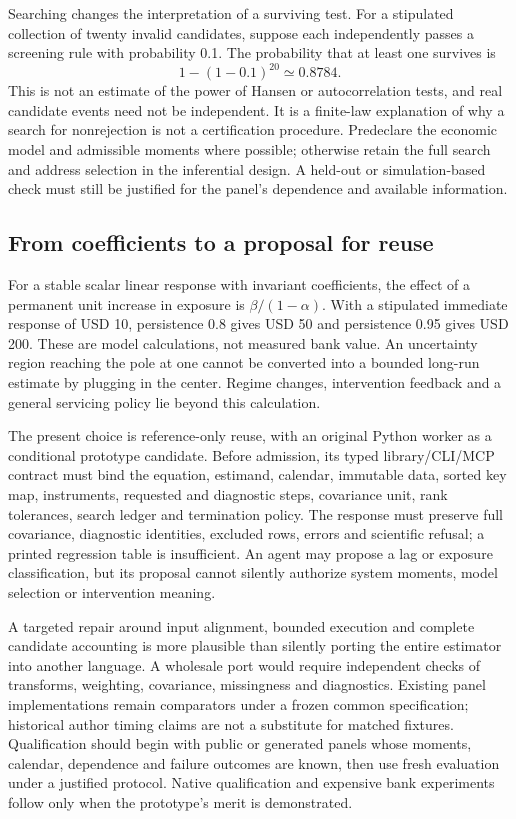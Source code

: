 Searching changes the interpretation of a surviving test. For a stipulated collection
of twenty invalid candidates, suppose each independently passes a screening rule with
probability 0.1. The probability that at least one survives is
\begin{equation}
 1-(1-0.1)^{20}\simeq0.8784.
\end{equation}
This is not an estimate of the power of Hansen or autocorrelation tests, and real
candidate events need not be independent. It is a finite-law explanation of why a
search for nonrejection is not a certification procedure. Predeclare the economic
model and admissible moments where possible; otherwise retain the full search and
address selection in the inferential design. A held-out or simulation-based check
must still be justified for the panel's dependence and available information.
\citep{exec24_pydynpd_reference}

\subsection{From coefficients to a proposal for reuse}
For a stable scalar linear response with invariant coefficients, the effect of a
permanent unit increase in exposure is $\beta/(1-\alpha)$. With a stipulated immediate
response of USD 10, persistence 0.8 gives USD 50 and persistence 0.95 gives USD 200.
These are model calculations, not measured bank value. An uncertainty region reaching
the pole at one cannot be converted into a bounded long-run estimate by plugging in
the center. Regime changes, intervention feedback and a general servicing policy lie
beyond this calculation.\citep{exec24_pydynpd_reference}

The present choice is reference-only reuse, with an original Python worker as a
conditional prototype candidate. Before admission, its typed library/CLI/MCP contract
must bind the equation, estimand, calendar, immutable data, sorted key map, instruments,
requested and diagnostic steps, covariance unit, rank tolerances, search ledger and
termination policy. The response must preserve full covariance, diagnostic identities,
excluded rows, errors and scientific refusal; a printed regression table is insufficient.
An agent may propose a lag or exposure classification, but its proposal cannot silently
authorize system moments, model selection or intervention meaning.

A targeted repair around input alignment, bounded execution and complete candidate
accounting is more plausible than silently porting the entire estimator into another
language. A wholesale port would require independent checks of transforms, weighting,
covariance, missingness and diagnostics. Existing panel implementations remain comparators
under a frozen common specification; historical author timing claims are not a substitute
for matched fixtures. Qualification should begin with public or generated panels whose
moments, calendar, dependence and failure outcomes are known, then use fresh evaluation
under a justified protocol. Native qualification and expensive bank experiments follow
only when the prototype's merit is demonstrated.


